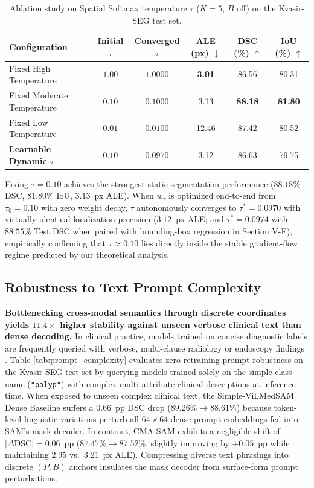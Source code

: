 \documentclass[onecolumn]{IEEEtran}
\numberwithin{equation}{section}
\theoremstyle{definition}
\theoremstyle{remark}
\begin{document}
\begin{table}[!htbp]
\centering
\caption{Ablation study on Spatial Softmax temperature $\tau$ ($K=5$, $B$ off) on the Kvasir-SEG test set.}
\label{tab:temperature_ablation}
\begin{tabularx}{\linewidth}{@{}Xccccc@{}}
\toprule
\textbf{Configuration} & \textbf{Initial $\tau$} & \textbf{Converged $\tau$} & \textbf{ALE (px)} $\downarrow$ & \textbf{DSC (\%)} $\uparrow$ & \textbf{IoU (\%)} $\uparrow$ \\
\midrule
Fixed High Temperature & $1.00$ & $1.0000$ & \textbf{3.01} & 86.56 & 80.31 \\
Fixed Moderate Temperature & $0.10$ & $0.1000$ & 3.13 & \textbf{88.18} & \textbf{81.80} \\
Fixed Low Temperature & $0.01$ & $0.0100$ & 12.46 & 87.42 & 80.52 \\
\midrule
\textbf{Learnable Dynamic $\tau$} & $0.10$ & $0.0970$ & 3.12 & 86.63 & 79.75 \\
\bottomrule
\end{tabularx}
\end{table}

Fixing $\tau = 0.10$ achieves the strongest static segmentation performance ($88.18\%$ DSC, $81.80\%$ IoU, $3.13$~px ALE). When $w_\tau$ is optimized end-to-end from $\tau_0 = 0.10$ with zero weight decay, $\tau$ autonomously converges to $\tau^* = 0.0970$ with virtually identical localization precision ($3.12$~px ALE; and $\tau^* = 0.0974$ with $88.55\%$ Test DSC when paired with bounding-box regression in Section V-F), empirically confirming that $\tau \approx 0.10$ lies directly inside the stable gradient-flow regime predicted by our theoretical analysis.

\subsection{Robustness to Text Prompt Complexity}

\textbf{Bottlenecking cross-modal semantics through discrete coordinates yields $11.4\times$ higher stability against unseen verbose clinical text than dense decoding.} In clinical practice, models trained on concise diagnostic labels are frequently queried with verbose, multi-clause radiology or endoscopy findings \cite{sellergren2025medgemma}. Table \ref{tab:prompt_complexity} evaluates zero-retraining prompt robustness on the Kvasir-SEG test set by querying models trained solely on the simple class name (\texttt{"polyp"}) with complex multi-attribute clinical descriptions at inference time. When exposed to unseen complex clinical text, the Simple-ViLMedSAM Dense Baseline suffers a $0.66$~pp DSC drop ($89.26\% \rightarrow 88.61\%$) because token-level linguistic variations perturb all $64 \times 64$ dense prompt embeddings fed into SAM's mask decoder. In contrast, CMA-SAM exhibits a negligible shift of $|\Delta\text{DSC}| = 0.06$~pp ($87.47\% \rightarrow 87.52\%$, slightly improving by $+0.05$~pp while maintaining $2.95$ vs.\ $3.21$~px ALE). Compressing diverse text phrasings into discrete $(P, B)$ anchors insulates the mask decoder from surface-form prompt perturbations.
\end{document}

